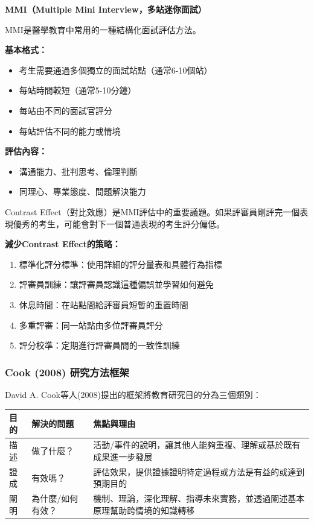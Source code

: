\documentclass[12pt,a4paper]{article}
\begin{document}
\begin{importantbox}
\textbf{MMI（Multiple Mini Interview，多站迷你面試）}

MMI是醫學教育中常用的一種結構化面試評估方法。

\textbf{基本格式：}
\begin{itemize}[nosep]
    \item 考生需要通過多個獨立的面試站點（通常6-10個站）
    \item 每站時間較短（通常5-10分鐘）
    \item 每站由不同的面試官評分
    \item 每站評估不同的能力或情境
\end{itemize}

\textbf{評估內容：}
\begin{itemize}[nosep]
    \item 溝通能力、批判思考、倫理判斷
    \item 同理心、專業態度、問題解決能力
\end{itemize}
\end{importantbox}

Contrast Effect（對比效應）是MMI評估中的重要議題。如果評審員剛評完一個表現優秀的考生，可能會對下一個普通表現的考生評分偏低。

\textbf{減少Contrast Effect的策略：}
\begin{enumerate}
    \item 標準化評分標準：使用詳細的評分量表和具體行為指標
    \item 評審員訓練：讓評審員認識這種偏誤並學習如何避免
    \item 休息時間：在站點間給評審員短暫的重置時間
    \item 多重評審：同一站點由多位評審員評分
    \item 評分校準：定期進行評審員間的一致性訓練
\end{enumerate}

\subsubsection{Cook (2008) 研究方法框架}

David A. Cook等人(2008)提出的框架將教育研究目的分為三個類別：

\begin{longtable}{p{2cm}p{4cm}p{8cm}}
\toprule
\textbf{目的} & \textbf{解決的問題} & \textbf{焦點與理由} \\
\midrule
\endhead
描述 & 做了什麼？ & 活動/事件的說明，讓其他人能夠重複、理解或基於既有成果進一步發展 \\
證成 & 有效嗎？ & 評估效果，提供證據證明特定過程或方法是有益的或達到預期目的 \\
闡明 & 為什麼/如何有效？ & 機制、理論，深化理解、指導未來實務，並透過闡述基本原理幫助跨情境的知識轉移 \\
\bottomrule
\end{longtable}
\end{document}
